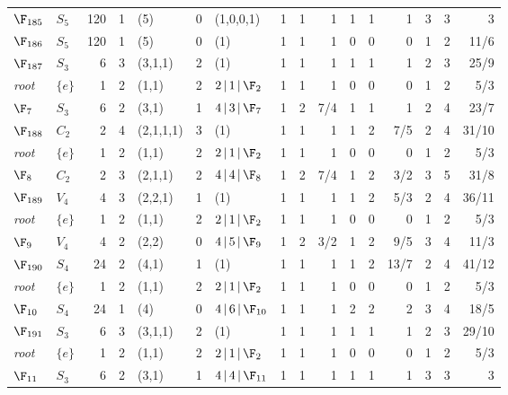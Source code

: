 \begin{landscape}
{\begin{longtable}{@{}l l r r l r l rrr rrr rrr@{}}
\addlinespace[3pt]
\textbf{$\F_{185}$} & $S_{5}$ & 120 & 1 & (5) & 0 & (1,0,0,1) & 1 & 1 & 1 & 1 & 1 & 1 & 3 & 3 & 3 \\
\addlinespace[3pt]
\textbf{$\F_{186}$} & $S_{5}$ & 120 & 1 & (5) & 0 & (1) & 1 & 1 & 1 & 0 & 0 & 0 & 1 & 2 & 11/6 \\
\addlinespace[3pt]
\textbf{$\F_{187}$} & $S_{3}$ & 6 & 3 & (3,1,1) & 2 & (1) & 1 & 1 & 1 & 1 & 1 & 1 & 2 & 3 & 25/9 \\
\quad\textit{root} & $\{e\}$ & 1 & 2 & (1,1) & 2 & $2\,|\,1\,|\,\F_{2}$ & 1 & 1 & 1 & 0 & 0 & 0 & 1 & 2 & 5/3 \\
\quad$\F_{7}$ & $S_{3}$ & 6 & 2 & (3,1) & 1 & $4\,|\,3\,|\,\F_{7}$ & 1 & 2 & 7/4 & 1 & 1 & 1 & 2 & 4 & 23/7 \\
\addlinespace[3pt]
\textbf{$\F_{188}$} & $C_{2}$ & 2 & 4 & (2,1,1,1) & 3 & (1) & 1 & 1 & 1 & 1 & 2 & 7/5 & 2 & 4 & 31/10 \\
\quad\textit{root} & $\{e\}$ & 1 & 2 & (1,1) & 2 & $2\,|\,1\,|\,\F_{2}$ & 1 & 1 & 1 & 0 & 0 & 0 & 1 & 2 & 5/3 \\
\quad$\F_{8}$ & $C_{2}$ & 2 & 3 & (2,1,1) & 2 & $4\,|\,4\,|\,\F_{8}$ & 1 & 2 & 7/4 & 1 & 2 & 3/2 & 3 & 5 & 31/8 \\
\addlinespace[3pt]
\textbf{$\F_{189}$} & $V_{4}$ & 4 & 3 & (2,2,1) & 1 & (1) & 1 & 1 & 1 & 1 & 2 & 5/3 & 2 & 4 & 36/11 \\
\quad\textit{root} & $\{e\}$ & 1 & 2 & (1,1) & 2 & $2\,|\,1\,|\,\F_{2}$ & 1 & 1 & 1 & 0 & 0 & 0 & 1 & 2 & 5/3 \\
\quad$\F_{9}$ & $V_{4}$ & 4 & 2 & (2,2) & 0 & $4\,|\,5\,|\,\F_{9}$ & 1 & 2 & 3/2 & 1 & 2 & 9/5 & 3 & 4 & 11/3 \\
\addlinespace[3pt]
\textbf{$\F_{190}$} & $S_{4}$ & 24 & 2 & (4,1) & 1 & (1) & 1 & 1 & 1 & 1 & 2 & 13/7 & 2 & 4 & 41/12 \\
\quad\textit{root} & $\{e\}$ & 1 & 2 & (1,1) & 2 & $2\,|\,1\,|\,\F_{2}$ & 1 & 1 & 1 & 0 & 0 & 0 & 1 & 2 & 5/3 \\
\quad$\F_{10}$ & $S_{4}$ & 24 & 1 & (4) & 0 & $4\,|\,6\,|\,\F_{10}$ & 1 & 1 & 1 & 2 & 2 & 2 & 3 & 4 & 18/5 \\
\addlinespace[3pt]
\textbf{$\F_{191}$} & $S_{3}$ & 6 & 3 & (3,1,1) & 2 & (1) & 1 & 1 & 1 & 1 & 1 & 1 & 2 & 3 & 29/10 \\
\quad\textit{root} & $\{e\}$ & 1 & 2 & (1,1) & 2 & $2\,|\,1\,|\,\F_{2}$ & 1 & 1 & 1 & 0 & 0 & 0 & 1 & 2 & 5/3 \\
\quad$\F_{11}$ & $S_{3}$ & 6 & 2 & (3,1) & 1 & $4\,|\,4\,|\,\F_{11}$ & 1 & 1 & 1 & 1 & 1 & 1 & 3 & 3 & 3 \\

\end{longtable}}
\end{landscape}
